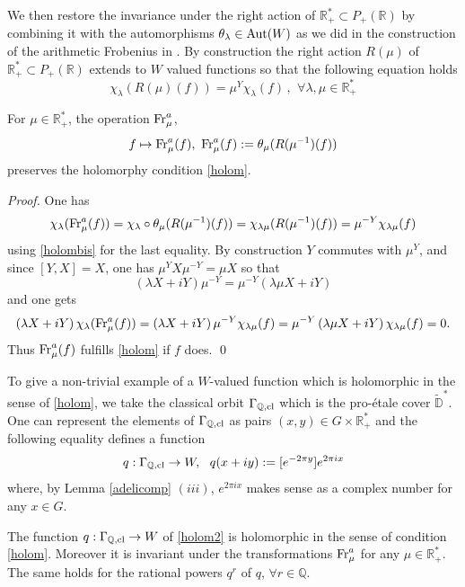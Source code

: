 \documentclass[graybox, envcountsect%
]{svmult}
\def\Aut{{\rm Aut}}
\def\D{{\mathbb D}}
\def\Q{{\mathbb Q}}
\def\R{{\mathbb R}}
\def\qqq{\,,\,~\forall}
\def\fr{{\rm Fr}}
\begin{document}
We then restore the invariance under the right action of $\R_+^*\subset P_+(\R)$ by combining it with the automorphisms $ \theta_\lambda\in \Aut(W)$ as we did in the construction of the arithmetic Frobenius in \cite{CC4}. By construction the right action $R(\mu)$  of $\R_+^*\subset P_+(\R)$ extends to $W$ valued functions so that the following equation holds
\begin{equation}\label{holombis}
 	\chi_\lambda(R(\mu)(f))=\mu^Y \chi_\lambda(f) \qqq \lambda, \mu \in \R_+^*
 \end{equation}
\begin{proposition}\label{frobarith}  For $\mu \in \R_+^*$, the operation $\fr^a_\mu$,
\begin{equation}\label{holom1}
f\mapsto \fr^a_\mu(f), \ \fr^a_\mu(f):= \theta_\mu(R(\mu^{-1})( f))
 \end{equation}
	preserves the holomorphy condition \eqref{holom}.
\end{proposition}
\begin{proof} One has
$$
\chi_\lambda(\fr^a_\mu(f))=\chi_\lambda\circ\theta_\mu(R(\mu^{-1})( f))=
\chi_{\lambda \mu}(R(\mu^{-1})( f))=\mu^{-Y}\chi_{\lambda \mu}(f)
$$
using  \eqref{holombis} for the last equality.
By construction $Y$ commutes with $\mu^Y$, and since $[Y,X]=X$, one has $\mu^Y X \mu^{-Y}=\mu X$ so that
$$
\left(\lambda X+iY\right) \mu^{-Y}=\mu^{-Y}\left(\lambda \mu X+iY\right)
$$
and one gets
$$
\left(\lambda X+iY\right)\chi_\lambda(\fr^a_\mu(f))=
\left(\lambda X+iY\right) \mu^{-Y}\chi_{\lambda \mu}( f)=\mu^{-Y}\left(\lambda \mu X+iY\right)\chi_{\lambda \mu}( f)=0.
$$
Thus $\fr^a_\mu(f)$ fulfills \eqref{holom} if $f$ does.
\qed\end{proof}
To give a non-trivial example of a $W$-valued function which is holomorphic in the sense of \eqref{holom}, we take the classical orbit $\Gamma_{\Q,{\rm cl}}$ 
	which is the pro-\' etale cover $\tilde \D^*$. One can represent the elements of $\Gamma_{\Q,{\rm cl}}$ as pairs $(x,y)\in G\times \R_+^*$ and the following equality defines a function  
 \begin{equation}\label{holom2}
 q:\Gamma_{\Q,{\rm cl}}\to W, \ \  q(x+iy):=[e^{-2\pi y}]e^{2\pi i x}
  \end{equation}
  where,  by Lemma \ref{adelicomp} $(iii)$, $e^{2\pi i x}$ makes sense as a complex number for any $x\in G$. 
  \begin{proposition}\label{functionq} The function $q:\Gamma_{\Q,{\rm cl}}\to W$ of \eqref{holom2} is holomorphic in the sense of condition \eqref{holom}. Moreover it is invariant under the transformations $\fr^a_\mu$ for any $\mu \in \R_+^*$. The same holds for the rational powers $q^r$ of $q$, $\forall r\in \Q$.
\end{proposition}
\end{document}

